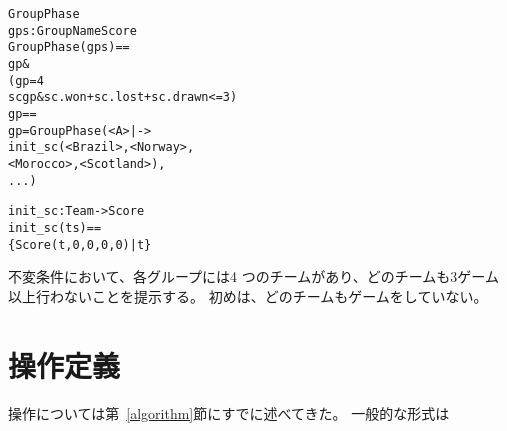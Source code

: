 \documentclass[\pformat,12pt]{jarticle}
\begin{document}
\begin{description}
\begin{alltt}
   GroupPhase 
    gps :  GroupName  Score
  GroupPhase(gps) ==
     gp  & 
      ( gp = 4 
        sc  gp & sc.won + sc.lost + sc.drawn <= 3)
   gp ==
    gp = GroupPhase ({ <A> |-> 
                                init_sc ({<Brazil>, <Norway>, 
                                    <Morocco>, <Scotland>}),
                         ...})


  init_sc :  Team ->  Score
  init_sc (ts) ==
    \{ Score (t,0,0,0,0) | t  \}
  \end{alltt}
  不変条件において、各グループには4 つのチームがあり、どのチームも3ゲーム以上行わないことを提示する。
  初めは、どのチームもゲームをしていない。

\end{description}

\section{操作定義} \label{op-def}

操作については第~\ref{algorithm}節にすでに述べてきた。 
一般的な形式は
\end{document}
